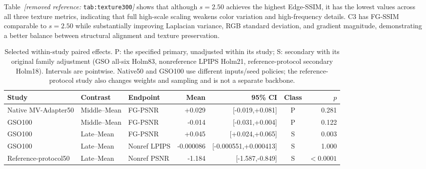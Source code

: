 \documentclass[times,twocolumn,final]{elsarticle}
\providecommand{\DIFdel}[1]{{\protect\color{red} \scriptsize #1}} %
\providecommand{\DIFaddbegin}{} %
\providecommand{\DIFaddend}{} %
\providecommand{\DIFdelbegin}{} %
\providecommand{\DIFdelend}{} %
\begin{document}
\DIFdelbegin \DIFdel{Table~\textit{[removed reference: }\texttt{tab:texture300}\textit{]} shows that although $s = 2.50$ achieves the highest Edge-SSIM, it has the lowest values across all three texture metrics, indicating that full high-scale scaling weakens color variation and high-frequency details. C3 has FG-SSIM comparable to $s = 2.50$ while substantially improving Laplacian variance, RGB standard deviation, and gradient magnitude, demonstrating a better balance between structural alignment and texture preservation. }\DIFdelend \DIFaddbegin \begin{table}[t]\centering\scriptsize\setlength{\tabcolsep}{3pt}
\caption{Selected within-study paired effects. P: the specified primary, unadjusted within its study; S: secondary with its original family adjustment (GSO all-six Holm83, nonreference LPIPS Holm21, reference-protocol secondary Holm18). Intervals are pointwise. Native50 and GSO100 use different inputs/seed policies; the reference-protocol study also changes weights and sampling and is not a separate backbone.}
\label{tab:interface-effects}
\begin{tabular}{lllrrcr}
\toprule Study & Contrast & Endpoint & Mean & 95\% CI & Class & $p$ \\
\midrule
Native MV-Adapter50 & Middle--Mean & FG-PSNR & +0.029 & [-0.019,+0.081] & P & 0.281 \\
GSO100 & Middle--Mean & FG-PSNR & -0.014 & [-0.031,+0.004] & P & 0.122 \\
GSO100 & Late--Mean & FG-PSNR & +0.045 & [+0.024,+0.065] & S & 0.003 \\
GSO100 & Late--Mean & Nonref LPIPS & -0.000086 & [-0.000551,+0.000413] & S & 1.000 \\
Reference-protocol50 & Late--Mean & Nonref PSNR & -1.184 & [-1.587,-0.849] & S & $<0.0001$ \\

\bottomrule\end{tabular}\end{table}
\DIFaddend 
\end{document}
